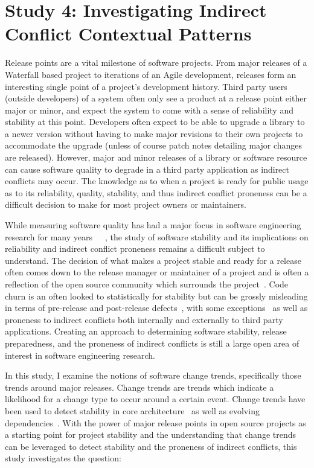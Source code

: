 \section{Study 4: Investigating Indirect Conflict Contextual Patterns}
\label{study:apie}

Release points are a vital milestone of software projects. From major releases of a Waterfall based project to iterations of an Agile development,
releases form an interesting single point of a project's development history.
Third party users (outside developers) of a system often only see a product at a release point either major or minor,
and expect the system to come with a sense of reliability and stability at this point. Developers often expect to be able to upgrade a library to
a newer version without having to make major revisions to their own projects to accommodate the upgrade (unless of course patch notes detailing major
changes are released). However, major and minor releases of a library or software resource can cause software quality to degrade in
a third party application as indirect conflicts may occur. The knowledge as to when a project is ready for public usage
as to its reliability, quality, stability, and thus indirect conflict proneness can be a difficult decision to make for most project owners or maintainers.

While measuring software quality has had a major focus in software engineering research for many years~\cite{Bowen:1978:CAS}~\cite{Grady:1993:PRM}~\cite{ISOIEC9126},
the study of software stability and its implications on reliability and indirect conflict proneness remains a difficult subject to understand. 
The decision of what makes a project stable and ready
for a release often comes down to the release manager or maintainer of a project and is often a reflection of the open source community which surrounds 
the project~\cite{Conway:1968}. Code churn is an often looked to statistically for stability but can be grossly misleading
in terms of pre-release and post-release defects~\cite{Fenton:2000:QAF}, with some exceptions~\cite{Nagappan:2005:URC} as well as proneness to indirect conflicts
both internally and externally to third party applications. 
Creating an approach to determining software stability, release preparedness, and the proneness of indirect conflicts is still a large open area of
interest in software engineering research.

In this study, I examine the notions of software change trends, specifically those trends around major releases. Change trends are trends which indicate
a likelihood for a change type to occur around a certain event. Change trends have been used to detect
stability in core architecture~\cite{Wermelinger:2008:AEE} as well as evolving dependencies~\cite{Businge:2010:ESE}.
With the power of major release points in open source projects as a starting point for project stability and the understanding that change trends can
be leveraged to detect stability and the proneness of indirect conflicts, this study investigates the question:

